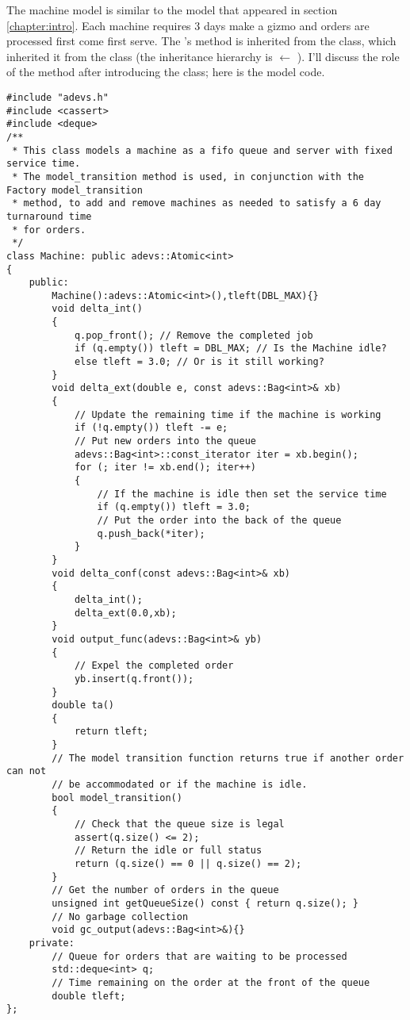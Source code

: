 The machine model is similar to the  model that appeared in section \ref{chapter:intro}. Each machine requires 3 days make a gizmo and orders are processed first come first serve. The 's  method is inherited from the  class, which inherited it from the  class (the inheritance hierarchy is  $\leftarrow$  ). I'll discuss the role of the  method after introducing the  class; here is the  model code.
\begin{verbatim}
#include "adevs.h"
#include <cassert>
#include <deque>
/**
 * This class models a machine as a fifo queue and server with fixed service time.
 * The model_transition method is used, in conjunction with the Factory model_transition
 * method, to add and remove machines as needed to satisfy a 6 day turnaround time
 * for orders. 
 */
class Machine: public adevs::Atomic<int> 
{
    public:
        Machine():adevs::Atomic<int>(),tleft(DBL_MAX){}
        void delta_int()
        {
            q.pop_front(); // Remove the completed job
            if (q.empty()) tleft = DBL_MAX; // Is the Machine idle?
            else tleft = 3.0; // Or is it still working?
        }
        void delta_ext(double e, const adevs::Bag<int>& xb)
        {
            // Update the remaining time if the machine is working
            if (!q.empty()) tleft -= e;
            // Put new orders into the queue
            adevs::Bag<int>::const_iterator iter = xb.begin();
            for (; iter != xb.end(); iter++) 
            {
                // If the machine is idle then set the service time
                if (q.empty()) tleft = 3.0;
                // Put the order into the back of the queue
                q.push_back(*iter);
            }
        }
        void delta_conf(const adevs::Bag<int>& xb)
        {
            delta_int();
            delta_ext(0.0,xb);
        }
        void output_func(adevs::Bag<int>& yb)
        {
            // Expel the completed order
            yb.insert(q.front());
        }
        double ta()
        {
            return tleft;
        }
        // The model transition function returns true if another order can not
        // be accommodated or if the machine is idle.
        bool model_transition()
        {
            // Check that the queue size is legal
            assert(q.size() <= 2);
            // Return the idle or full status
            return (q.size() == 0 || q.size() == 2);
        }
        // Get the number of orders in the queue
        unsigned int getQueueSize() const { return q.size(); }
        // No garbage collection 
        void gc_output(adevs::Bag<int>&){}
    private:
        // Queue for orders that are waiting to be processed
        std::deque<int> q;
        // Time remaining on the order at the front of the queue
        double tleft; 
};
\end{verbatim}

